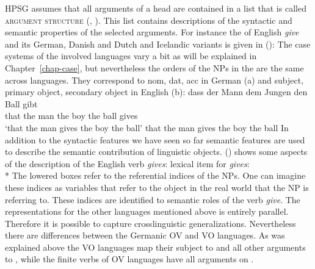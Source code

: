HPSG assumes that all arguments of a head are contained in a list that is called \textsc{argument
  structure} (\argst, \citealp{WKD2020a}). This list contains descriptions of the syntactic and semantic properties of
the selected arguments. For instance the \argstl of English \emph{give} and its German, Danish and
Dutch and Icelandic variants is given in ():
\ea
{}
\z
The case systems of the involved languages vary a bit as will be explained in
Chapter~\ref{chap-case}, but nevertheless the orders of the NPs in the \argstl are the same across
languages. They correspond to nom, dat, acc in German (a) and subject, primary object, secondary object
in English (b):
\eal
\ex dass der Mann dem Jungen den Ball gibt\\
    that the man  the boy    the ball gives\\
\glt `that the man gives the boy the ball'
\ex that the man gives the boy the ball
\zl
In addition to the syntactic features we have seen so far semantic features are used to describe the
semantic contribution of linguistic objects. () shows some aspects of the description of the English verb
\emph{gives}:
\ea
lexical item for \emph{gives}:\\*
\z
The lowered boxes refer to the referential indices of the NPs. One can imagine these indices as
variables that refer to the object in the real world that the NP is referring to. These indices are
identified to semantic roles of the verb \emph{give}. The representations for the other languages
mentioned above is entirely parallel. Therefore it is possible to capture crosslinguistic
generalizations. Nevertheless there are differences between the Germanic OV and VO languages. As was
explained above the VO languages map their subject to \spr and all other arguments to \comps, while
the finite verbs of OV languages have all arguments on \comps.



